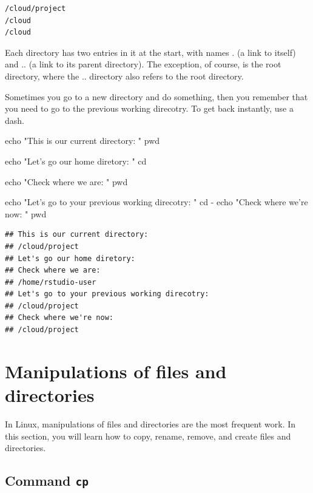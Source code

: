 \documentclass[]{book}
\makeatletter
\newenvironment{Shaded}{\begin{snugshade}}{\end{snugshade}}
\newcommand{\BuiltInTok}[1]{#1}
\newcommand{\NormalTok}[1]{#1}
\newcommand{\StringTok}[1]{\textcolor[rgb]{0.31,0.60,0.02}{#1}}
\newenvironment{kframe}{%
\medskip{}
\setlength{\fboxsep}{.8em}
 \def\at@end@of@kframe{}%
 \ifinner\ifhmode%
  \def\at@end@of@kframe{\end{minipage}}%
  \begin{minipage}{\columnwidth}%
 \fi\fi%
 \def\FrameCommand##1{\hskip\@totalleftmargin \hskip-\fboxsep
 \colorbox{shadecolor}{##1}\hskip-\fboxsep
     \hskip-\linewidth \hskip-\@totalleftmargin \hskip\columnwidth}%
 \MakeFramed {\advance\hsize-\width
   \@totalleftmargin\z@ \linewidth\hsize
   \@setminipage}}%
 {\par\unskip\endMakeFramed%
 \at@end@of@kframe}
\renewenvironment{Shaded}{\begin{kframe}}{\end{kframe}}
\makeatother
\begin{document}
\begin{verbatim}
/cloud/project
/cloud
/cloud
\end{verbatim}

Each directory has two entries in it at the start, with names . (a link to itself) and .. (a link to its parent directory). The exception, of course, is the root directory, where the .. directory also refers to the root directory.

Sometimes you go to a new directory and do something, then you remember that you need to go to the previous working direcotry. To get back instantly, use a dash.

\begin{Shaded}
\begin{Highlighting}[]
\BuiltInTok{echo} \StringTok{"This is our current directory: "}
\BuiltInTok{pwd}

\BuiltInTok{echo} \StringTok{"Let's go our home diretory: "}
\BuiltInTok{cd}\NormalTok{ ~}

\BuiltInTok{echo} \StringTok{"Check where we are: "}
\BuiltInTok{pwd}

\BuiltInTok{echo} \StringTok{"Let's go to your previous working direcotry: "}
\BuiltInTok{cd}\NormalTok{ -}
\BuiltInTok{echo} \StringTok{"Check where we're now: "}
\BuiltInTok{pwd}
\end{Highlighting}
\end{Shaded}

\begin{verbatim}
## This is our current directory: 
## /cloud/project
## Let's go our home diretory: 
## Check where we are: 
## /home/rstudio-user
## Let's go to your previous working direcotry: 
## /cloud/project
## Check where we're now: 
## /cloud/project
\end{verbatim}

\hypertarget{manipulations-of-files-and-directories}{%
\section{Manipulations of files and directories}\label{manipulations-of-files-and-directories}}

In Linux, manipulations of files and directories are the most frequent work. In this section, you will learn how to copy, rename, remove, and create files and directories.

\hypertarget{command-cp}{%
\subsection{\texorpdfstring{Command \texttt{cp}}{Command cp}}\label{command-cp}}
\end{document}
